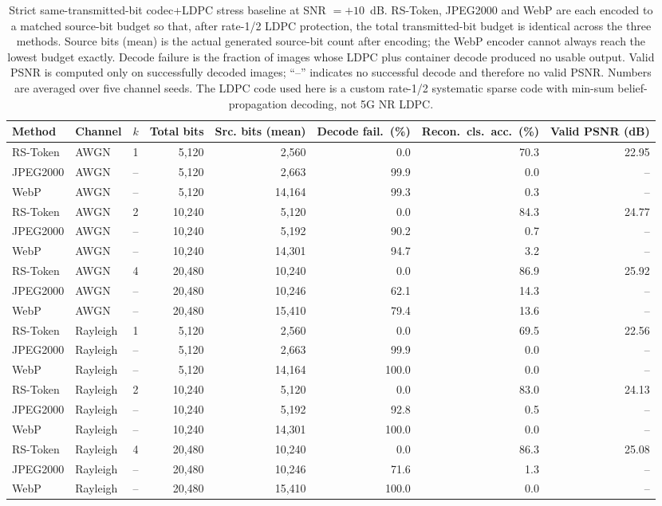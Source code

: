 \documentclass[lettersize,journal]{IEEEtran}
\begin{document}
\begin{table}[!t]
\centering
\caption{Strict same-transmitted-bit codec+LDPC stress baseline at SNR $=+10$~dB. RS-Token, JPEG2000 and WebP are each encoded to a matched source-bit budget so that, after rate-1/2 LDPC protection, the total transmitted-bit budget is identical across the three methods. Source bits (mean) is the actual generated source-bit count after encoding; the WebP encoder cannot always reach the lowest budget exactly. Decode failure is the fraction of images whose LDPC plus container decode produced no usable output. Valid PSNR is computed only on successfully decoded images; ``--'' indicates no successful decode and therefore no valid PSNR. Numbers are averaged over five channel seeds. The LDPC code used here is a custom rate-1/2 systematic sparse code with min-sum belief-propagation decoding, not 5G NR LDPC.}
\label{tab:codec_ldpc_strict}
\begin{tabular}{@{}llcrrrrr@{}}
\toprule
Method & Channel & $k$ & Total bits & Src. bits (mean) & Decode fail.\ (\%) & Recon.\ cls.\ acc.\ (\%) & Valid PSNR (dB) \\
\midrule
RS-Token & AWGN     & 1  &  5{,}120 &  2{,}560 &   0.0 & 70.3 & 22.95 \\
JPEG2000 & AWGN     & -- &  5{,}120 &  2{,}663 &  99.9 &  0.0 & --    \\
WebP     & AWGN     & -- &  5{,}120 & 14{,}164 &  99.3 &  0.3 & --    \\
RS-Token & AWGN     & 2  & 10{,}240 &  5{,}120 &   0.0 & 84.3 & 24.77 \\
JPEG2000 & AWGN     & -- & 10{,}240 &  5{,}192 &  90.2 &  0.7 & --    \\
WebP     & AWGN     & -- & 10{,}240 & 14{,}301 &  94.7 &  3.2 & --    \\
RS-Token & AWGN     & 4  & 20{,}480 & 10{,}240 &   0.0 & 86.9 & 25.92 \\
JPEG2000 & AWGN     & -- & 20{,}480 & 10{,}246 &  62.1 & 14.3 & --    \\
WebP     & AWGN     & -- & 20{,}480 & 15{,}410 &  79.4 & 13.6 & --    \\
\midrule
RS-Token & Rayleigh & 1  &  5{,}120 &  2{,}560 &   0.0 & 69.5 & 22.56 \\
JPEG2000 & Rayleigh & -- &  5{,}120 &  2{,}663 &  99.9 &  0.0 & --    \\
WebP     & Rayleigh & -- &  5{,}120 & 14{,}164 & 100.0 &  0.0 & --    \\
RS-Token & Rayleigh & 2  & 10{,}240 &  5{,}120 &   0.0 & 83.0 & 24.13 \\
JPEG2000 & Rayleigh & -- & 10{,}240 &  5{,}192 &  92.8 &  0.5 & --    \\
WebP     & Rayleigh & -- & 10{,}240 & 14{,}301 & 100.0 &  0.0 & --    \\
RS-Token & Rayleigh & 4  & 20{,}480 & 10{,}240 &   0.0 & 86.3 & 25.08 \\
JPEG2000 & Rayleigh & -- & 20{,}480 & 10{,}246 &  71.6 &  1.3 & --    \\
WebP     & Rayleigh & -- & 20{,}480 & 15{,}410 & 100.0 &  0.0 & --    \\
\bottomrule
\end{tabular}
\end{table}
\end{document}
